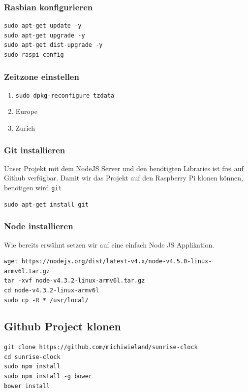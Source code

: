 \subsubsection{Rasbian konfigurieren}
\begin{lstlisting}
sudo apt-get update -y
sudo apt-get upgrade -y
sudo apt-get dist-upgrade -y
sudo raspi-config
\end{lstlisting}

\subsubsection{Zeitzone einstellen}
\begin{enumerate}
	\item \lstinline|sudo dpkg-reconfigure tzdata|
	\item Europe
	\item Zurich
\end{enumerate}


\subsubsection{Git installieren}
Unser Projekt mit dem NodeJS Server und den benötigten Libraries ist frei auf Github verfügbar. Damit wir das Projekt auf den Raspberry Pi klonen können, benötigen wird \lstinline|git|
\begin{lstlisting}[caption=Git installieren]
sudo apt-get install git
\end{lstlisting}

\subsubsection{Node installieren}
Wie bereits erwähnt setzen wir auf eine einfach Node JS Applikation. 
\begin{lstlisting}[caption=Node installieren]
wget https://nodejs.org/dist/latest-v4.x/node-v4.5.0-linux-armv6l.tar.gz   
tar -xvf node-v4.3.2-linux-armv6l.tar.gz 
cd node-v4.3.2-linux-armv6l
sudo cp -R * /usr/local/
\end{lstlisting}

\subsection{Github Project klonen}
\begin{lstlisting}[caption=Github klonen]
git clone https://github.com/michiwieland/sunrise-clock
cd sunrise-clock
sudo npm install
sudo npm install -g bower
bower install
\end{lstlisting}

